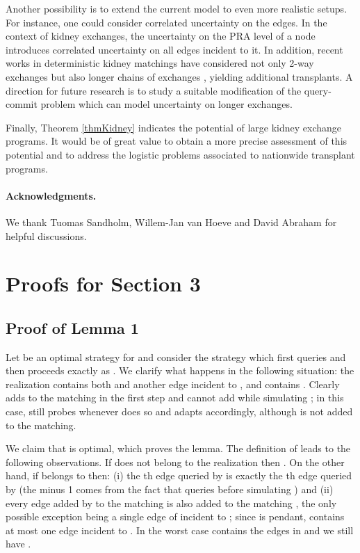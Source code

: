 \documentclass[12pt]{article}
\newcommand{\pendantFirst}[0]{1}
\begin{document}
		Another possibility is to extend the current model to even more realistic setups. For instance, one could consider correlated uncertainty on the edges. In the context of kidney exchanges, the uncertainty on the PRA level of a node introduces correlated uncertainty on all edges incident to it. In addition, recent works in deterministic kidney matchings have considered not only 2-way exchanges but also longer chains of exchanges \cite{david, roth3}, yielding additional transplants. A direction for future research is to study a suitable modification of the query-commit problem which can model uncertainty on longer exchanges. 
		
		Finally, Theorem \ref{thmKidney} indicates the potential of large kidney exchange programs. It would be of great value to obtain a more precise assessment of this potential and to address the logistic problems associated to nationwide transplant programs. 
		
	\paragraph{Acknowledgments.} We thank Tuomas Sandholm, Willem-Jan van Hoeve and David Abraham for helpful discussions.
			





		
	\appendix

	\section{Proofs for Section 3}
	
	\subsection{Proof of Lemma \pendantFirst}
	
		Let  be an optimal strategy for  and consider the strategy  which first queries  and then proceeds exactly as . We clarify what happens in the following situation: the realization  contains both  and another edge  incident to , and  contains . Clearly  adds  to the matching in the first step and cannot add  while simulating ; in this case,  still probes  whenever  does so and adapts accordingly, although  is not added to the matching. 
		
		We claim that  is optimal, which proves the lemma. The definition of  leads to the following observations. If  does not belong to the realization  then . On the other hand, if  belongs to  then: (i) the th edge queried by  is exactly the th edge queried by  (the minus 1 comes from the fact that  queries  before simulating ) and (ii) every edge added by  to the matching  is also added to the matching , the only possible exception being a single edge  of  incident to ; since  is pendant,  contains at most one edge incident to . In the worst case  contains the edges in  and we still have . 
		
\end{document}
